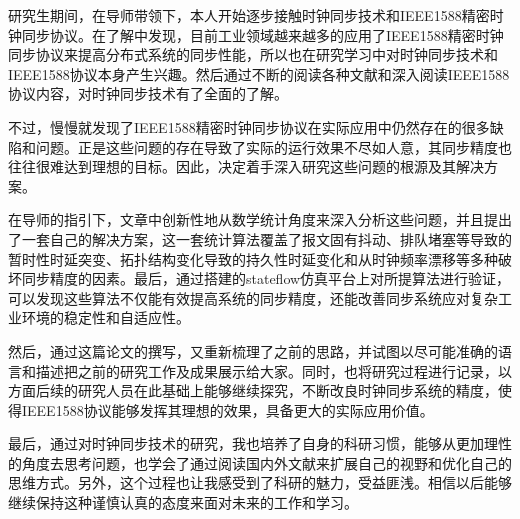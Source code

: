 
\begin{summary}
研究生期间，在导师带领下，本人开始逐步接触时钟同步技术和IEEE1588精密时钟同步协议。在了解中发现，目前工业领域越来越多的应用了IEEE1588精密时钟同步协议来提高分布式系统的同步性能，所以也在研究学习中对时钟同步技术和IEEE1588协议本身产生兴趣。然后通过不断的阅读各种文献和深入阅读IEEE1588协议内容，对时钟同步技术有了全面的了解。

不过，慢慢就发现了IEEE1588精密时钟同步协议在实际应用中仍然存在的很多缺陷和问题。正是这些问题的存在导致了实际的运行效果不尽如人意，其同步精度也往往很难达到理想的目标。因此，决定着手深入研究这些问题的根源及其解决方案。

在导师的指引下，文章中创新性地从数学统计角度来深入分析这些问题，并且提出了一套自己的解决方案，这一套统计算法覆盖了报文固有抖动、排队堵塞等导致的暂时性时延突变、拓扑结构变化导致的持久性时延变化和从时钟频率漂移等多种破坏同步精度的因素。最后，通过搭建的stateflow仿真平台上对所提算法进行验证，可以发现这些算法不仅能有效提高系统的同步精度，还能改善同步系统应对复杂工业环境的稳定性和自适应性。

然后，通过这篇论文的撰写，又重新梳理了之前的思路，并试图以尽可能准确的语言和描述把之前的研究工作及成果展示给大家。同时，也将研究过程进行记录，以方面后续的研究人员在此基础上能够继续探究，不断改良时钟同步系统的精度，使得IEEE1588协议能够发挥其理想的效果，具备更大的实际应用价值。

最后，通过对时钟同步技术的研究，我也培养了自身的科研习惯，能够从更加理性的角度去思考问题，也学会了通过阅读国内外文献来扩展自己的视野和优化自己的思维方式。另外，这个过程也让我感受到了科研的魅力，受益匪浅。相信以后能够继续保持这种谨慎认真的态度来面对未来的工作和学习。

\end{summary}
